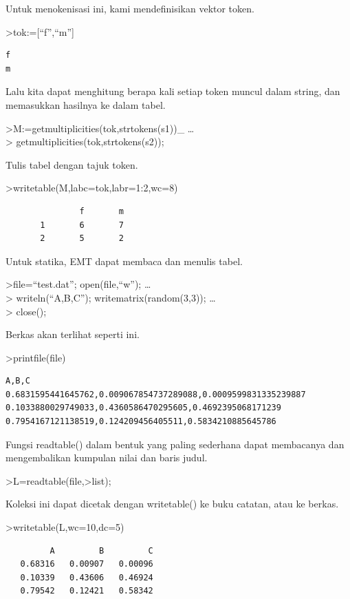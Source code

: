 \documentclass[
]{book}
\begin{document}
Untuk menokenisasi ini, kami mendefinisikan vektor token.

\textgreater tok:={[}``f'',``m''{]}

\begin{verbatim}
f
m
\end{verbatim}

Lalu kita dapat menghitung berapa kali setiap token muncul dalam string, dan memasukkan hasilnya ke dalam tabel.

\textgreater M:=getmultiplicities(tok,strtokens(s1))\_ \ldots{}\\
\textgreater{} getmultiplicities(tok,strtokens(s2));

Tulis tabel dengan tajuk token.

\textgreater writetable(M,labc=tok,labr=1:2,wc=8)

\begin{verbatim}
               f       m
       1       6       7
       2       5       2
\end{verbatim}

Untuk statika, EMT dapat membaca dan menulis tabel.

\textgreater file=``test.dat''; open(file,``w''); \ldots{}\\
\textgreater{} writeln(``A,B,C''); writematrix(random(3,3)); \ldots{}\\
\textgreater{} close();

Berkas akan terlihat seperti ini.

\textgreater printfile(file)

\begin{verbatim}
A,B,C
0.6831595441645762,0.009067854737289088,0.0009599831335239887
0.1033880029749033,0.4360586470295605,0.4692395068171239
0.7954167121138519,0.124209456405511,0.5834210885645786
\end{verbatim}

Fungsi readtable() dalam bentuk yang paling sederhana dapat membacanya dan mengembalikan kumpulan nilai dan baris judul.

\textgreater L=readtable(file,\textgreater list);

Koleksi ini dapat dicetak dengan writetable() ke buku catatan, atau ke berkas.

\textgreater writetable(L,wc=10,dc=5)

\begin{verbatim}
         A         B         C
   0.68316   0.00907   0.00096
   0.10339   0.43606   0.46924
   0.79542   0.12421   0.58342
\end{verbatim}
\end{document}

